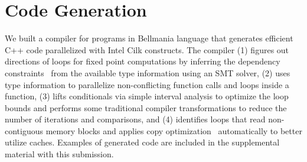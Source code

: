 \section{Code Generation}
\label{codegen}

We built a compiler for programs in Bellmania language that generates efficient C++ code parallelized with Intel Cilk constructs. The compiler (1) figures out directions of loops for fixed point computations by inferring the dependency constraints~\cite{JACM67/Karp} from the available type information using an SMT solver, (2) uses type information to parallelize non-conflicting function calls and loops inside a function, (3) lifts conditionals via simple interval analysis to optimize the loop bounds and performs some traditional compiler transformations to reduce the number of iterations and comparisons, and (4) identifies loops that read non-contiguous memory blocks and applies copy optimization~\cite{ASPLOS91/Lam} automatically to better utilize caches. Examples of generated code are included in the supplemental material with this submission.

 

